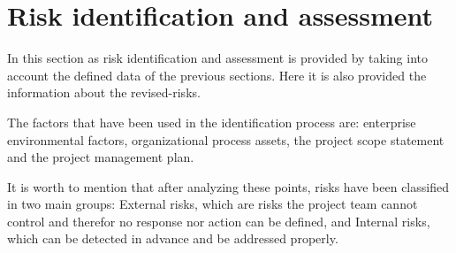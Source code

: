 \section{Risk identification and assessment}

In this section as risk identification and assessment is provided by taking into account the defined data of the previous sections. Here it is also provided the information about the revised-risks. 

The factors that have been used in the identification process are: enterprise environmental factors, organizational process assets, the project scope statement and the project management plan.

It is worth to mention that after analyzing these points, risks have been classified in two main groups: External risks, which are risks the project team cannot control and therefor no response nor action can be defined, and Internal risks, which can be detected in advance and be addressed properly.

